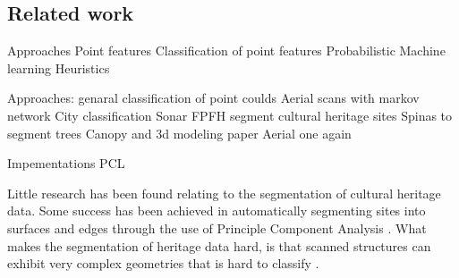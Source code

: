 \documentclass[10pt,twocolumn]{article}
\begin{document}




\subsection{Related work}


Approaches
	Point features
	Classification of point features
		Probabilistic
		Machine learning
		Heuristics


Approaches:
	genaral classification of point coulds
		Aerial scans with markov network \cite{Shapovalov2010}
		City classification \cite{Golovinskiy2009}
		Sonar \cite{Arge2010}
		FPFH \cite{Rusu2009} \cite{Rusu2008}
	segment cultural heritage sites
		Spinas \cite{Spina2010}
	to segment trees
		Canopy and 3d modeling paper \cite{Wang2008}
		Aerial one again \cite{Shapovalov2010}
	
Impementations
	PCL
		
	

Little research has been found relating to the segmentation of cultural heritage data. Some success has been achieved in automatically segmenting sites into surfaces and edges through the use of Principle Component Analysis \cite{Spina2010}. What makes the segmentation of heritage data hard, is that scanned structures can exhibit very complex geometries that is hard to classify \cite{Spina2010}.




\end{document}
